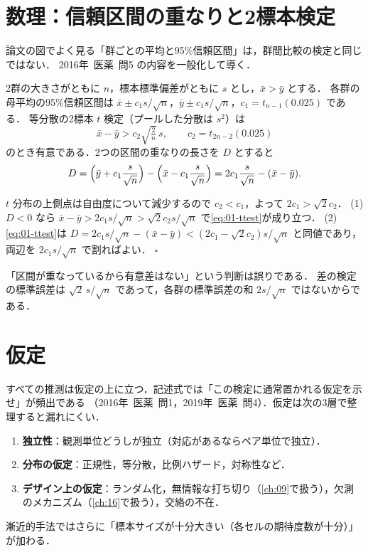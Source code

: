 \documentclass[a4paper,11pt,openany]{ltjsbook}
\newtheorem{meidai}[teigi]{命題}
\newenvironment{proof}[1][証明]{\par\smallskip\noindent{\sffamily\bfseries #1}\quad\ignorespaces}{\nobreak\hfill$\square$\par\medskip}
\newcommand{\tagbox}[2]{\tcbox[on line,boxsep=0.5pt,left=2pt,right=2pt,top=0.5pt,bottom=0.5pt,
  colframe=#1,colback=#1!10,boxrule=0.4pt,arc=1pt]{\scriptsize\bfseries\textcolor{#1}{#2}}}
\newcommand{\Hinshutsu}{\tagbox{bkorange}{頻出}}
\newcommand{\kakomon}[2]{\mbox{#1年 医薬 問#2}}
\begin{document}
\section{数理：信頼区間の重なりと2標本検定}\label{sec:01-overlap}
\Hinshutsu 論文の図でよく見る「群ごとの平均と95\%信頼区間」は，群間比較の検定と同じではない．
\kakomon{2016}{5} の内容を一般化して導く．

2群の大きさがともに $n$，標本標準偏差がともに $s$ とし，$\bar x>\bar y$ とする．
各群の母平均の95\%信頼区間は $\bar x\pm c_1 s/\sqrt n$，$\bar y\pm c_1 s/\sqrt n$，$c_1=t_{n-1}(0.025)$ である．
等分散の2標本 $t$ 検定（プールした分散は $s^2$）は
\begin{equation}
\bar x-\bar y>c_2\sqrt{\tfrac{2}{n}}\,s,\qquad c_2=t_{2n-2}(0.025)\label{eq:01-ttest}
\end{equation}
のとき有意である．2つの区間の重なりの長さを $D$ とすると
\[
D=\Bigl(\bar y+c_1\frac{s}{\sqrt n}\Bigr)-\Bigl(\bar x-c_1\frac{s}{\sqrt n}\Bigr)=2c_1\frac{s}{\sqrt n}-(\bar x-\bar y).
\]
\begin{proof}
$t$ 分布の上側点は自由度について減少するので $c_2<c_1$，よって $2c_1>\sqrt2 c_2$．
(1) $D<0$ なら $\bar x-\bar y>2c_1 s/\sqrt n>\sqrt2 c_2 s/\sqrt n$ で\cref{eq:01-ttest}が成り立つ．
(2) \cref{eq:01-ttest}は $D=2c_1s/\sqrt n-(\bar x-\bar y)<(2c_1-\sqrt2c_2)s/\sqrt n$ と同値であり，両辺を $2c_1s/\sqrt n$ で割ればよい．
\end{proof}
「区間が重なっているから有意差はない」という判断は誤りである．
差の検定の標準誤差は $\sqrt2\,s/\sqrt n$ であって，各群の標準誤差の和 $2s/\sqrt n$ ではないからである．

\section{仮定}\label{sec:01-assump}
すべての推測は仮定の上に立つ．記述式では「この検定に通常置かれる仮定を示せ」が頻出である
（\kakomon{2016}{1}，\kakomon{2019}{4}）．仮定は次の3層で整理すると漏れにくい．
\begin{enumerate}
\item \textbf{独立性}：観測単位どうしが独立（対応があるならペア単位で独立）．
\item \textbf{分布の仮定}：正規性，等分散，比例ハザード，対称性など．
\item \textbf{デザイン上の仮定}：ランダム化，無情報な打ち切り（\cref{ch:09}で扱う），欠測のメカニズム（\cref{ch:16}で扱う），交絡の不在．
\end{enumerate}
漸近的手法ではさらに「標本サイズが十分大きい（各セルの期待度数が十分）」が加わる．
\end{document}
